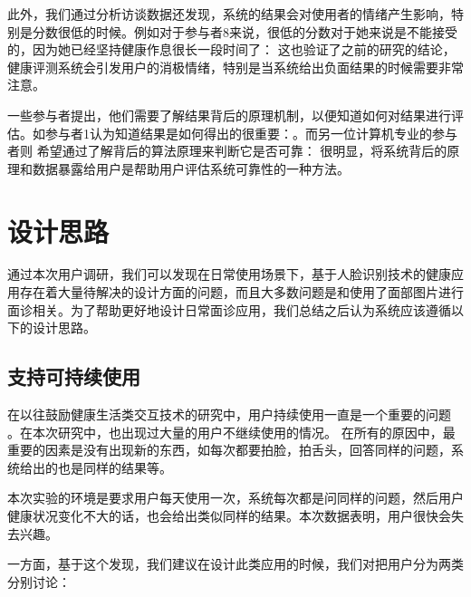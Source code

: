 此外，我们通过分析访谈数据还发现，系统的结果会对使用者的情绪产生影响，特别是分数很低的时候。例如对于参与者8来说，很低的分数对于她来说是不能接受的，因为她已经坚持健康作息很长一段时间了： 这也验证了之前的研究\cite{Toscos2013Designing}的结论，健康评测系统会引发用户的消极情绪，特别是当系统给出负面结果的时候需要非常注意。

一些参与者提出，他们需要了解结果背后的原理机制，以便知道如何对结果进行评估。如参与者1认为知道结果是如何得出的很重要：。而另一位计算机专业的参与者则
希望通过了解背后的算法原理来判断它是否可靠： 很明显，将系统背后的原理和数据暴露给用户是帮助用户评估系统可靠性的一种方法。

\section{设计思路}

通过本次用户调研，我们可以发现在日常使用场景下，基于人脸识别技术的健康应用存在着大量待解决的设计方面的问题，而且大多数问题是和使用了面部图片进行面诊相关。为了帮助更好地设计日常面诊应用，我们总结之后认为系统应该遵循以下的设计思路。

\subsection{支持可持续使用}
在以往鼓励健康生活类交互技术的研究中，用户持续使用一直是一个重要的问题\cite{Clawson2015No} \cite{Epstein2016Beyond}。在本次研究中，也出现过大量的用户不继续使用的情况。
在所有的原因中，最重要的因素是没有出现新的东西，如每次都要拍脸，拍舌头，回答同样的问题，系统给出的也是同样的结果等。

本次实验的环境是要求用户每天使用一次，系统每次都是问同样的问题，然后用户健康状况变化不大的话，也会给出类似同样的结果。本次数据表明，用户很快会失去兴趣。

一方面，基于这个发现，我们建议在设计此类应用的时候，我们对把用户分为两类分别讨论：

